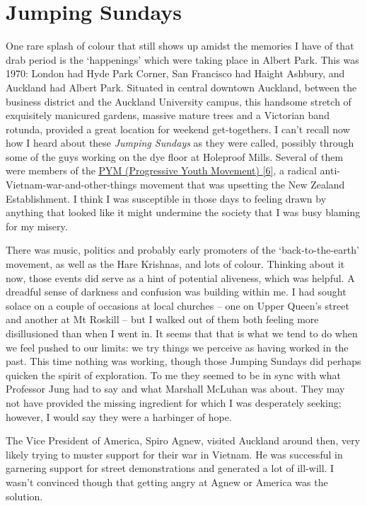 \chapter{Jumping Sundays}

One rare splash of colour that still shows up amidst the memories I have
of that drab period is the `happenings' which were taking place in
Albert Park. This was 1970: London had Hyde Park Corner, San Francisco
had Haight Ashbury, and Auckland had Albert Park. Situated in central
downtown Auckland, between the business district and the Auckland
University campus, this handsome stretch of exquisitely manicured
gardens, massive mature trees and a Victorian band rotunda, provided a
great location for weekend get-togethers. I can't recall now how I heard
about these \emph{Jumping Sundays} as they were called, possibly through
some of the guys working on the dye floor at Holeproof Mills. Several of
them were members of the
\href{https://antivietnamwarprotest.weebly.com/the-pym.html}{\underline{PYM}
(Progressive Youth Movement) {[}6{]}}, a radical
anti-Vietnam-war-and-other-things movement that was upsetting the New
Zealand Establishment. I think I was susceptible in those days to
feeling drawn by anything that looked like it might undermine the
society that I was busy blaming for my misery.

There was music, politics and probably early promoters of the
`back-to-the-earth' movement, as well as the Hare Krishnas, and lots of
colour. Thinking about it now, those events did serve as a hint of
potential aliveness, which was helpful. A dreadful sense of darkness and
confusion was building within me. I had sought solace on a couple of
occasions at local churches -- one on Upper Queen's street and another
at Mt Roskill -- but I walked out of them both feeling more
disillusioned than when I went in. It seems that that is what we tend to
do when we feel pushed to our limits: we try things we perceive as
having worked in the past. This time nothing was working, though those
Jumping Sundays did perhaps quicken the spirit of exploration. To me
they seemed to be in sync with what Professor Jung had to say and what
Marshall McLuhan was about. They may not have provided the missing
ingredient for which I was desperately seeking; however, I would say
they were a harbinger of hope.

The Vice President of America, Spiro Agnew, visited Auckland around
then, very likely trying to muster support for their war in Vietnam. He
was successful in garnering support for street demonstrations and
generated a lot of ill-will. I wasn't convinced though that getting
angry at Agnew or America was the solution.

